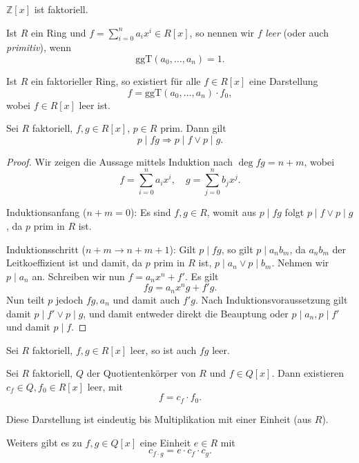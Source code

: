\begin{corollary}
    $\mathbb{Z}[x]$ ist faktoriell.
\end{corollary}

\begin{definition}
    Ist $R$ ein Ring und $f = \sum_{i=0}^n a_i x^i \in R[x]$, so nennen wir $f$ \emph{leer} (oder auch \emph{primitiv}), wenn
    $$ \mathrm{ggT}( a_0, \hdots, a_n ) = 1. $$
\end{definition}

\begin{remark}
    Ist $R$ ein faktorieller Ring, so existiert für alle $f \in R[x]$ eine Darstellung
    $$ f = \mathrm{ggT}(a_0, \hdots, a_n) \cdot f_0, $$
    wobei $f \in R[x]$ leer ist.
\end{remark}

\begin{lemma}
    Sei $R$ faktoriell, $f, g \in R[x]$, $p \in R$ prim. Dann gilt
    $$ p \mid f g \Rightarrow p \mid f \lor p \mid g. $$
\end{lemma}

\begin{proof}
    Wir zeigen die Aussage mittels Induktion nach $\deg fg = n+m$, wobei
    $$ f = \sum_{i=0}^n a_i x^i,\quad g = \sum_{j=0}^n b_j x^j. $$

    Induktionsanfang ($n+m=0$): Es sind $f, g \in R$, womit aus $p \mid fg$ folgt $p \mid f \lor p \mid g$, da $p$ prim in $R$ ist.

    Induktionsschritt ($n+m \to n+m+1$): Gilt $p \mid fg$, so gilt $p \mid a_n b_m$, da $a_n b_m$ der Leitkoeffizient ist und damit, da $p$ prim in $R$ ist, $p \mid a_n \lor p \mid b_m$. Nehmen wir \obda $p \mid a_n$ an. Schreiben wir nun $f = a_n x^n + f'$. Es gilt
    $$ fg = a_n x^n g + f' g. $$
    Nun teilt $p$ jedoch $fg, a_n$ und damit auch $f' g$. Nach Induktionsvoraussetzung gilt damit $p \mid f' \lor p \mid g$, und damit entweder direkt die Beauptung oder $p \mid a_n, p \mid f'$ und damit $p \mid f$.
\end{proof}

\begin{corollary}
    Sei $R$ faktoriell, $f,g \in R[x]$ leer, so ist auch $fg$ leer.
\end{corollary}

\begin{lemma}
    Sei $R$ faktoriell, $Q$ der Quotientenkörper von $R$ und $f \in Q[x]$. Dann existieren $c_f \in Q, f_0 \in R[x]$ leer, mit
    $$ f = c_f \cdot f_0. $$

    Diese Darstellung ist eindeutig bis Multiplikation mit einer Einheit (aus $R$).

    Weiters gibt es zu $f, g \in Q[x]$ eine Einheit $e \in R$ mit
    $$ c_{f \cdot g} = e \cdot c_f \cdot c_g. $$
\end{lemma}

